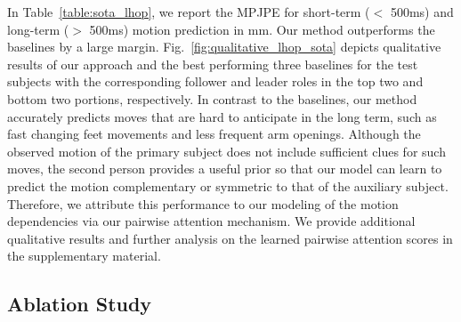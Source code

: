 In Table~\ref{table:sota_lhop}, we report the MPJPE for short-term ($<$ 500ms) and long-term ($>$ 500ms) motion prediction in mm. Our method outperforms the baselines by a large margin. Fig.~\ref{fig:qualitative_lhop_sota} depicts qualitative results of our approach and the best performing three baselines for the \lindyhop{} test subjects with the corresponding follower and leader roles in the top two and bottom two portions, respectively. In contrast to the baselines, our method accurately predicts moves that are hard to anticipate in the long term, such as fast changing feet movements and less frequent arm openings. Although the observed motion of the primary subject does not include sufficient clues for such moves, the second person provides a useful prior so that our model can learn to predict the motion complementary or symmetric to that of the auxiliary subject. Therefore, we attribute this performance to our modeling of the motion dependencies via our pairwise attention mechanism. We provide additional qualitative results and further analysis on the learned pairwise attention scores in the supplementary material.






\subsection{Ablation Study}




